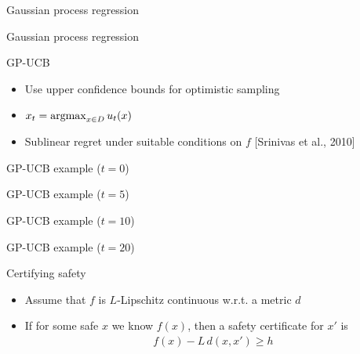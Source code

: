 \documentclass[xetex,10pt,mathserif]{beamer}
\newlength\figureheight
\newlength\figurewidth
\newcommand{\qcite}[1]{{\small\color{gray}[#1]}}
\begin{document}
\begin{frame}{Gaussian process regression}
\centering
\setlength\figurewidth{5in}
\setlength\figureheight{3.5in}

\end{frame}

\begin{frame}{Gaussian process regression}
\centering
\setlength\figurewidth{5in}
\setlength\figureheight{3.5in}

\end{frame}

\begin{frame}{GP-UCB}
\begin{itemize}
\item<1-> Use upper confidence bounds for optimistic sampling
\vspace{1em}
\item<2-> $x_t = \argmax_{x \in D}u_t(x)$\\[1em]
  \centering
  \setlength\figurewidth{4in}
  \setlength\figureheight{2.5in}
  
\vspace{0.5em}
\item<3-> Sublinear regret under suitable conditions on $f$ \qcite{Srinivas et al., 2010}
\end{itemize}
\end{frame}

\begin{frame}{GP-UCB example ($t = 0$)}
\centering
\setlength\figurewidth{5in}
\setlength\figureheight{3.5in}

\end{frame}

\begin{frame}{GP-UCB example ($t = 5$)}
\centering
\setlength\figurewidth{5in}
\setlength\figureheight{3.5in}

\end{frame}

\begin{frame}{GP-UCB example ($t = 10$)}
\centering
\setlength\figurewidth{5in}
\setlength\figureheight{3.5in}

\end{frame}

\begin{frame}{GP-UCB example ($t = 20$)}
\centering
\setlength\figurewidth{5in}
\setlength\figureheight{3.5in}

\end{frame}

\begin{frame}{Certifying safety}
\begin{itemize}
\item<1-> Assume that $f$ is $L$-Lipschitz continuous w.r.t. a metric $d$
\vspace{2em}
\item<2-> If for some safe $x$ we know $f(x)$, then a safety certificate for $x'$ is
\begin{align*}
f(x) - L\,d(x, x') \geq h
\end{align*}
\end{itemize}
\end{frame}
\end{document}
